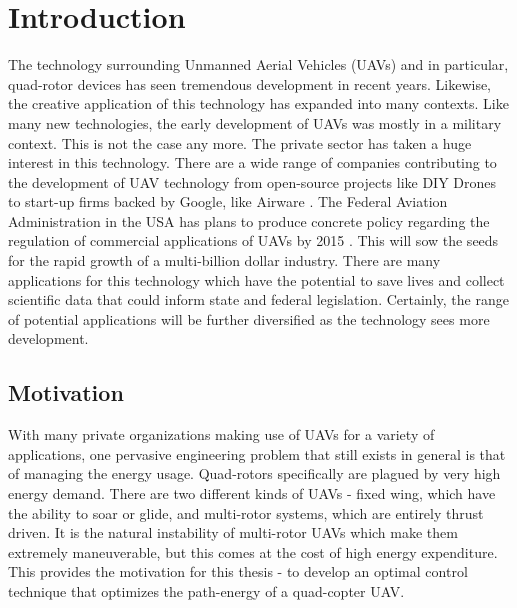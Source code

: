 
\chapter{Introduction} %

\label{Introduction} %



The technology surrounding Unmanned Aerial Vehicles (UAVs) and in particular, quad-rotor devices has seen tremendous development in recent years. Likewise, the creative application of this technology has expanded into many contexts. Like many new technologies, the early development of UAVs was mostly in a military context. This is not the case any more. The private sector has taken a huge interest in this technology. There are a wide range of companies contributing to the development of UAV technology from open-source projects like DIY Drones \cite{diydrones} to start-up firms backed by Google, like Airware \cite{airware}.  The Federal Aviation Administration in the USA has plans to produce concrete policy regarding the regulation of commercial applications of UAVs by 2015 \cite{faa}. This will sow the seeds for the rapid growth of a multi-billion dollar industry. There are many applications for this technology which have the potential to save lives and collect scientific data that could inform state and federal legislation. Certainly, the range of potential applications will be further diversified as the technology sees more development. 


\section{Motivation}

With many private organizations making use of UAVs for a variety of applications, one pervasive engineering problem that still exists in general is that of managing the energy usage. Quad-rotors specifically are plagued by very high energy demand. There are two different kinds of UAVs - fixed wing, which have the ability to soar or glide, and multi-rotor systems, which are entirely thrust driven. It is the natural instability of multi-rotor UAVs which make them extremely maneuverable, but this comes at the cost of high energy expenditure. This provides the motivation for this thesis - to develop an optimal control technique that optimizes the path-energy of a quad-copter UAV.


